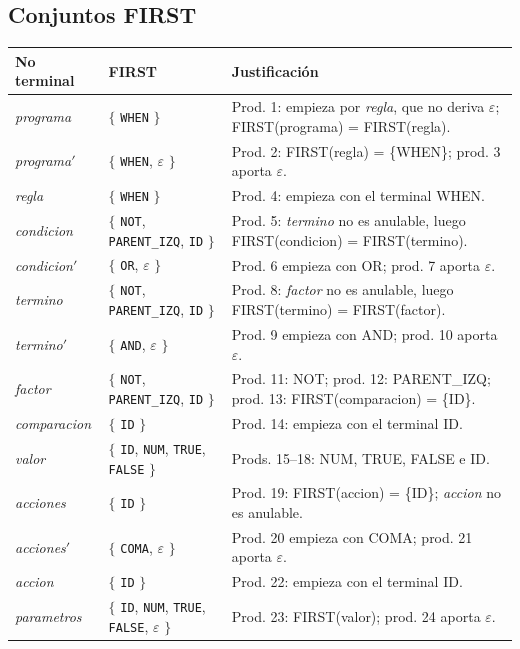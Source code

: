 \subsection{Conjuntos FIRST}
\begin{longtable}{@{}>{\raggedright\arraybackslash}p{2.6cm} >{\raggedright\arraybackslash}p{5.3cm} >{\raggedright\arraybackslash}p{6.9cm}@{}}
\toprule
\textbf{No terminal} & \textbf{FIRST} & \textbf{Justificación} \\
\midrule
\endhead
\textit{programa} & $\{$ \texttt{WHEN} $\}$ & \footnotesize Prod. 1: empieza por \textit{regla}, que no deriva $\varepsilon$; FIRST(programa) = FIRST(regla). \\
\textit{programa}$'$ & $\{$ \texttt{WHEN}, $\varepsilon$ $\}$ & \footnotesize Prod. 2: FIRST(regla) = \{WHEN\}; prod. 3 aporta $\varepsilon$. \\
\textit{regla} & $\{$ \texttt{WHEN} $\}$ & \footnotesize Prod. 4: empieza con el terminal WHEN. \\
\textit{condicion} & $\{$ \texttt{NOT}, \texttt{PARENT\_IZQ}, \texttt{ID} $\}$ & \footnotesize Prod. 5: \textit{termino} no es anulable, luego FIRST(condicion) = FIRST(termino). \\
\textit{condicion}$'$ & $\{$ \texttt{OR}, $\varepsilon$ $\}$ & \footnotesize Prod. 6 empieza con OR; prod. 7 aporta $\varepsilon$. \\
\textit{termino} & $\{$ \texttt{NOT}, \texttt{PARENT\_IZQ}, \texttt{ID} $\}$ & \footnotesize Prod. 8: \textit{factor} no es anulable, luego FIRST(termino) = FIRST(factor). \\
\textit{termino}$'$ & $\{$ \texttt{AND}, $\varepsilon$ $\}$ & \footnotesize Prod. 9 empieza con AND; prod. 10 aporta $\varepsilon$. \\
\textit{factor} & $\{$ \texttt{NOT}, \texttt{PARENT\_IZQ}, \texttt{ID} $\}$ & \footnotesize Prod. 11: NOT; prod. 12: PARENT\_IZQ; prod. 13: FIRST(comparacion) = \{ID\}. \\
\textit{comparacion} & $\{$ \texttt{ID} $\}$ & \footnotesize Prod. 14: empieza con el terminal ID. \\
\textit{valor} & $\{$ \texttt{ID}, \texttt{NUM}, \texttt{TRUE}, \texttt{FALSE} $\}$ & \footnotesize Prods. 15--18: NUM, TRUE, FALSE e ID. \\
\textit{acciones} & $\{$ \texttt{ID} $\}$ & \footnotesize Prod. 19: FIRST(accion) = \{ID\}; \textit{accion} no es anulable. \\
\textit{acciones}$'$ & $\{$ \texttt{COMA}, $\varepsilon$ $\}$ & \footnotesize Prod. 20 empieza con COMA; prod. 21 aporta $\varepsilon$. \\
\textit{accion} & $\{$ \texttt{ID} $\}$ & \footnotesize Prod. 22: empieza con el terminal ID. \\
\textit{parametros} & $\{$ \texttt{ID}, \texttt{NUM}, \texttt{TRUE}, \texttt{FALSE}, $\varepsilon$ $\}$ & \footnotesize Prod. 23: FIRST(valor); prod. 24 aporta $\varepsilon$. \\
\bottomrule
\end{longtable}

